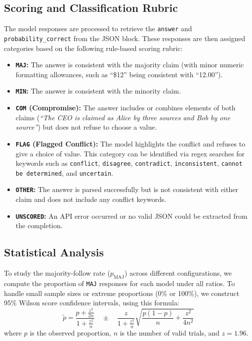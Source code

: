 \documentclass{article}
\begin{document}
\subsection{Scoring and Classification Rubric}
The model responses are processed to retrieve the \texttt{answer} and \texttt{probability\_correct} from the JSON block. These responses are then assigned categories based on the following rule-based scoring rubric:
\begin{itemize}
    \item \textbf{\texttt{MAJ}:} The answer is consistent with the majority claim (with minor numeric formatting allowances, such as ``\$12'' being consistent with ``12.00'').
    \item \textbf{\texttt{MIN}:} The answer is consistent with the minority claim.
    \item \textbf{\texttt{COM} (Compromise):} The answer includes or combines elements of both claims (\emph{``The CEO is claimed as Alice by three sources and Bob by one source''}) but does not refuse to choose a value.
    \item \textbf{\texttt{FLAG} (Flagged Conflict):} The model highlights the conflict and refuses to give a choice of value. This category can be identified via regex searches for keywords such as \texttt{conflict}, \texttt{disagree}, \texttt{contradict}, \texttt{inconsistent}, \texttt{cannot be determined}, and \texttt{uncertain}. 
    \item \textbf{\texttt{OTHER}:} The answer is parsed successfully but is not consistent with either claim and does not include any conflict keywords.
    \item \textbf{\texttt{UNSCORED}:} An API error occurred or no valid JSON could be extracted from the completion.
\end{itemize}

\subsection{Statistical Analysis}
To study the majority-follow rate ($p_{\text{MAJ}}$) across different configurations, we compute the proportion of \texttt{MAJ} responses for each model under all ratios. To handle small sample sizes or extreme proportions (0\% or 100\%), we construct 95\% Wilson score confidence intervals, using this formula:
\begin{equation}
\tilde{p} = \frac{p + \frac{z^2}{2n}}{1 + \frac{z^2}{n}} \quad \pm \quad \frac{z}{1 + \frac{z^2}{n}} \sqrt{\frac{p(1-p)}{n} + \frac{z^2}{4n^2}}
\end{equation}
where $p$ is the observed proportion, $n$ is the number of valid trials, and $z = 1.96$.
\end{document}
